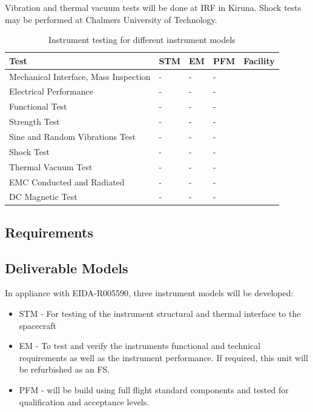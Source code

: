 Vibration and thermal vacuum tests will be done at IRF in Kiruna. Shock tests may be performed at Chalmers University of Technology\cite{Jonsson}. 
%
\begin{table}[H]
\centering
\caption{Instrument testing for different instrument models}
\label{tab:instrument_testing}
\begin{tabular}{p{}p{}p{}p{}p{}}
\hline
\textbf{Test} & \textbf{STM} & \textbf{EM} & \textbf{PFM} & \textbf{Facility}\\
\hline
Mechanical Interface, Mass Inspection & - & - & - & \\
Electrical Performance & - & - & - & \\
Functional Test & - & - & - & \\
Strength Test & - & - & - & \\
Sine and Random Vibrations Test & - & - & - & \\
Shock Test & - & - & - & \\
Thermal Vacuum Test & - & - & - &\\
EMC Conducted and Radiated & - & - & - & \\
DC Magnetic Test & - & - & - &\\
\hline
\end{tabular}
\end{table}

%
\subsection{Requirements}
\subsection{Deliverable Models}
%
In appliance with EIDA-R005590\cite{EIDA}, three instrument models will be developed:
\begin{itemize}
\item \ac{STM} - For testing of the instrument structural and thermal interface to the spacecraft\\
\item \ac{EM} - To test and verify the instruments functional and technical requirements as well as the instrument performance. If required, this unit will be refurbished as an \ac{FS}.\\
\item \ac{PFM} - will be build using full flight standard components and tested for qualification and acceptance levels.
\end{itemize}
%
